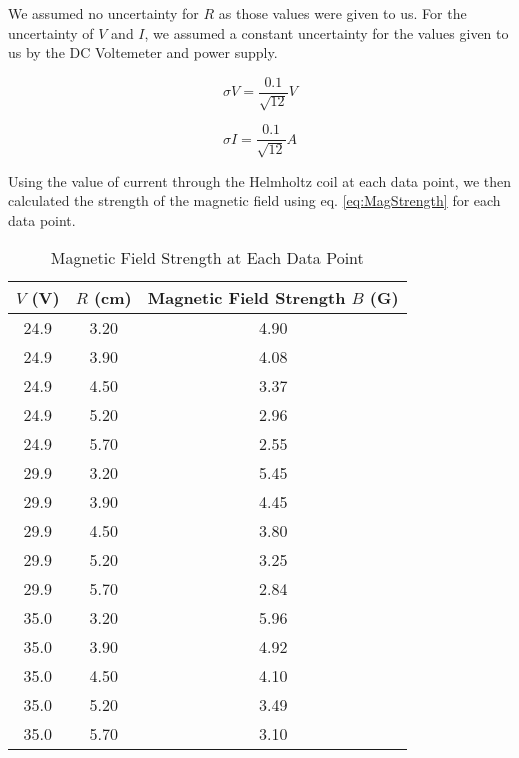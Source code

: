 \documentclass[journal, a4paper]{IEEEtran}
\begin{document}
    We assumed no uncertainty for $R$ as those values were given to us. For the uncertainty of $V$ and $I$, we assumed a constant uncertainty for the values given to us by the DC Voltemeter and power supply.
    
      \begin{equation} \label{eq:VUncertainty} %
\sigma V = \frac{0.1}{\sqrt{12}} V
\end{equation}

  \begin{equation} \label{eq:IUncertainty} %
\sigma I = \frac{0.1}{\sqrt{12}} A
\end{equation}
    
    Using the value of current through the Helmholtz coil at each data point, we then calculated the strength of the magnetic field using eq. \ref{eq:MagStrength} for each data point.
    
    \begin{table}[!hbt]
		\begin{center}
		\caption{Magnetic Field Strength at Each Data Point}
		\label{tab:FieldStrength}
		\begin{tabular}{|c|c|c|}
			\hline
			$V$ (V) & $R$ (cm) & Magnetic Field Strength $B$ (G) \\
			\hline
			24.9 & 3.20 & 4.90 \\
			\hline
			24.9 & 3.90 & 4.08 \\
			\hline
			24.9 & 4.50 & 3.37 \\
			\hline
            24.9 & 5.20 & 2.96 \\
            \hline 
            24.9 & 5.70 & 2.55 \\
            \hline
            29.9 & 3.20 & 5.45 \\
            \hline
            29.9 & 3.90 & 4.45 \\
            \hline
            29.9 & 4.50 & 3.80 \\
            \hline
            29.9 & 5.20 & 3.25 \\
            \hline
            29.9 & 5.70 & 2.84 \\
            \hline
            35.0 & 3.20 & 5.96 \\
            \hline
            35.0 & 3.90 & 4.92 \\
            \hline
            35.0 & 4.50 & 4.10 \\
            \hline
            35.0 & 5.20 & 3.49 \\
           	\hline
            35.0 & 5.70 & 3.10 \\
            \hline
		\end{tabular}
		\end{center}
	\end{table}
    
\end{document}
